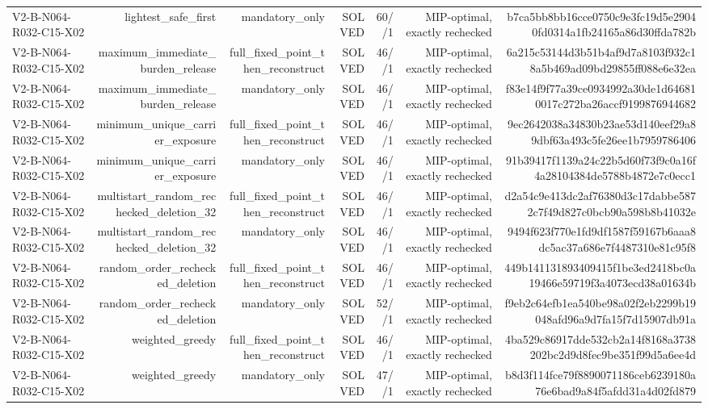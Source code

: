{\begin{longtable}{lrrrrrr}
V2-B-N064-R032-C15-X02 & lightest\_safe\_first & mandatory\_only & SOLVED & 60//1 & MIP-optimal, exactly rechecked & b7ca5bb8bb16cce0750c9e3fc19d5e29040fd0314a1fb24165a86d30ffda782b \\
V2-B-N064-R032-C15-X02 & maximum\_immediate\_burden\_release & full\_fixed\_point\_then\_reconstruct & SOLVED & 46//1 & MIP-optimal, exactly rechecked & 6a215c53144d3b51b4af9d7a8103f932c18a5b469ad09bd29855ff088e6e32ea \\
V2-B-N064-R032-C15-X02 & maximum\_immediate\_burden\_release & mandatory\_only & SOLVED & 46//1 & MIP-optimal, exactly rechecked & f83e14f9f77a39ce0934992a30de1d646810017c272ba26accf9199876944682 \\
V2-B-N064-R032-C15-X02 & minimum\_unique\_carrier\_exposure & full\_fixed\_point\_then\_reconstruct & SOLVED & 46//1 & MIP-optimal, exactly rechecked & 9ec2642038a34830b23ae53d140eef29a89dbf63a493c5fe26ee1b7959786406 \\
V2-B-N064-R032-C15-X02 & minimum\_unique\_carrier\_exposure & mandatory\_only & SOLVED & 46//1 & MIP-optimal, exactly rechecked & 91b39417f1139a24c22b5d60f73f9c0a16f4a28104384de5788b4872e7c0ecc1 \\
V2-B-N064-R032-C15-X02 & multistart\_random\_rechecked\_deletion\_32 & full\_fixed\_point\_then\_reconstruct & SOLVED & 46//1 & MIP-optimal, exactly rechecked & d2a54c9e413dc2af76380d3c17dabbe5872c7f49d827c0bcb90a598b8b41032e \\
V2-B-N064-R032-C15-X02 & multistart\_random\_rechecked\_deletion\_32 & mandatory\_only & SOLVED & 46//1 & MIP-optimal, exactly rechecked & 9494f623f770e1fd9df1587f59167b6aaa8dc5ac37a686e7f4487310e81c95f8 \\
V2-B-N064-R032-C15-X02 & random\_order\_rechecked\_deletion & full\_fixed\_point\_then\_reconstruct & SOLVED & 46//1 & MIP-optimal, exactly rechecked & 449b141131893409415f1be3ed2418bc0a19466e59719f3a4073ecd38a01634b \\
V2-B-N064-R032-C15-X02 & random\_order\_rechecked\_deletion & mandatory\_only & SOLVED & 52//1 & MIP-optimal, exactly rechecked & f9eb2c64efb1ea540be98a02f2eb2299b19048afd96a9d7fa15f7d15907db91a \\
V2-B-N064-R032-C15-X02 & weighted\_greedy & full\_fixed\_point\_then\_reconstruct & SOLVED & 46//1 & MIP-optimal, exactly rechecked & 4ba529c86917dde532cb2a14f8168a3738202bc2d9d8fec9be351f99d5a6ee4d \\
V2-B-N064-R032-C15-X02 & weighted\_greedy & mandatory\_only & SOLVED & 47//1 & MIP-optimal, exactly rechecked & b8d3f114fce79f8890071186ceb6239180a76e6bad9a84f5afdd31a4d02fd879 \\

\end{longtable}}
